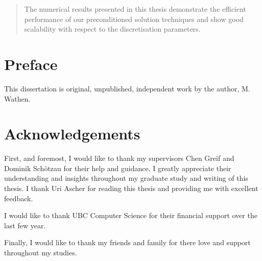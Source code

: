 \documentclass[msc,oneside]{ubcthesis}
\numberwithin{equation}{chapter}    %
\newcommand{\fenics}{{\tt FEniCS} }
\begin{document}
\begin{abstract}



The numerical results presented in this thesis demonstrate the efficient performance of our preconditioned solution techniques and show good scalability with respect to the discretisation parameters.



\end{abstract}
\chapter{Preface}

This dissertation is original, unpublished, independent work by the author, M. Wathen.


\tableofcontents                %
\listoftables                   %
\listoffigures                  %

\chapter{Acknowledgements}      %


First, and foremost, I would like to thank my supervisors Chen Greif and Dominik Sch{\"o}tzau for their help and guidance. I greatly appreciate their understanding and insights  throughout my graduate study and writing of this thesis. I thank Uri Ascher for reading this thesis and providing me with excellent feedback.

I would like to thank UBC Computer Science for  their financial support over the last few year.

Finally, I would like to thank my friends and family for there love and support throughout my studies.
\end{document}
